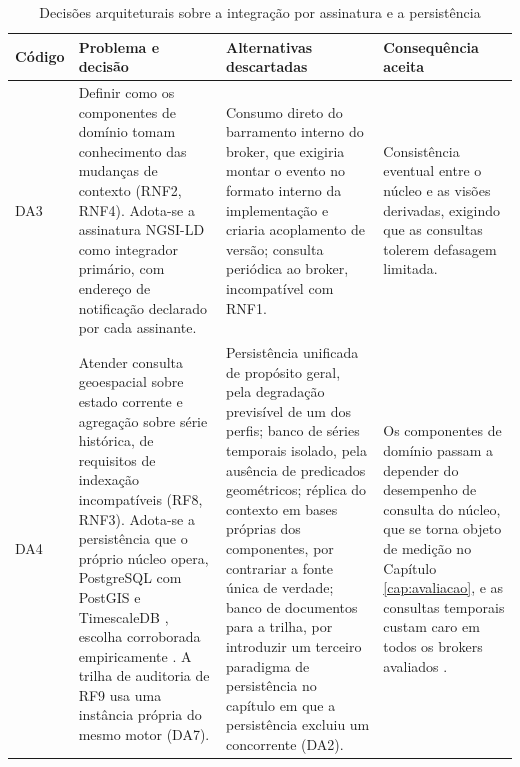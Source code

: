 \begin{table}[H]
\centering
\caption{Decisões arquiteturais sobre a integração por assinatura e a persistência}
\label{tab:adr}
\scriptsize
\begin{tabularx}{\textwidth}{@{}l>{\raggedright\arraybackslash}p{3.1cm}XX@{}}
\toprule
\textbf{Código} & \textbf{Problema e decisão} & \textbf{Alternativas descartadas} & \textbf{Consequência aceita} \\
\midrule
DA3 & Definir como os componentes de domínio tomam conhecimento das mudanças de contexto (RNF2, RNF4). Adota-se a assinatura NGSI-LD como integrador primário, com endereço de notificação declarado por cada assinante. & Consumo direto do barramento interno do broker, que exigiria montar o evento no formato interno da implementação e criaria acoplamento de versão; consulta periódica ao broker, incompatível com RNF1. & Consistência eventual entre o núcleo e as visões derivadas, exigindo que as consultas tolerem defasagem limitada. \\
\addlinespace
DA4 & Atender consulta geoespacial sobre estado corrente e agregação sobre série histórica, de requisitos de indexação incompatíveis (RF8, RNF3). Adota-se a persistência que o próprio núcleo opera, PostgreSQL com PostGIS \cite{obe2021postgis} e TimescaleDB \cite{timescale2025docs}, escolha corroborada empiricamente \cite{john2023application,rudakov2023comparison,simanjuntak2022multiple}. A trilha de auditoria de RF9 usa uma instância própria do mesmo motor (DA7). & Persistência unificada de propósito geral, pela degradação previsível de um dos perfis; banco de séries temporais isolado, pela ausência de predicados geométricos; réplica do contexto em bases próprias dos componentes, por contrariar a fonte única de verdade; banco de documentos para a trilha, por introduzir um terceiro paradigma de persistência no capítulo em que a persistência excluiu um concorrente (DA2). & Os componentes de domínio passam a depender do desempenho de consulta do núcleo, que se torna objeto de medição no Capítulo \ref{cap:avaliacao}, e as consultas temporais custam caro em todos os brokers avaliados \cite{ntallaris2024benchmarking}. \\
\bottomrule
\end{tabularx}
\end{table}

